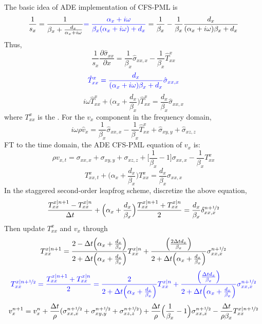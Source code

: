 The basic idea of ADE implementation of CFS-PML is
\[ \frac{1}{s_x}=\frac{1}{\beta_x+\frac{d_x}{\alpha_x+i\omega}} {\color{blue}=\frac{\alpha_x+i\omega}{\beta_x(\alpha_x+i\omega)+d_x}} =\frac{1}{\beta_x}-\frac{1}{\beta_x}\frac{d_x}{(\alpha_x+i\omega)\beta_x+d_x} \]
Thus,
\[ \frac{1}{s_x}\frac{\partial\hat\sigma_{xx}}{\partial x}=\frac{1}{\beta_x}\hat\sigma_{xx,x}-\frac{1}{\beta_x}\hat T_{xx}^x \]
\[ {\color{blue} \hat T_{xx}^x=\frac{d_x}{(\alpha_x+i\omega)\beta_x+d_x}\hat\sigma_{xx,x} } \]
\[ i\omega\hat T_{xx}^x+\Big(\alpha_x+\frac{d_x}{\beta_x}\Big)\hat T_{xx}^x=\frac{d_x}{\beta_x}\hat\sigma_{xx,x} \]
where $T_{xx}^x$ is the .
For the $v_x$ component in the frequency domain,
\[ i\omega\rho\hat v_x=\frac{1}{\beta_x}\hat\sigma_{xx,x}-\frac{1}{\beta_x}\hat T_{xx}^x+\hat\sigma_{xy,y}+\hat\sigma_{xz,z} \]
FT to the time domain, the ADE CFS-PML equation of $v_x$ is:
\[ \rho v_{x,t}=\sigma_{xx,x}+\sigma_{xy,y}+\sigma_{xz,z}+\Big[\frac{1}{\beta_x}-1\Big]\sigma_{xx,x}-\frac{1}{\beta_x}T_{xx}^x \]
\[ T_{xx,t}^x+\Big(\alpha_x+\frac{d_x}{\beta_x}\Big)T_{xx}^x=\frac{d_x}{\beta_x}\sigma_{xx,x} \]
In the staggered second-order leapfrog scheme, discretize the above equation,
\[ \frac{T_{xx}^{x|n+1}-T_{xx}^{x|n}}{\Delta t}+\Big(\alpha_x+\frac{d_x}{\beta_x}\Big)\frac{T_{xx}^{x|n+1}+T_{xx}^{x|n}}{2}=\frac{d_x}{\beta_x}\delta_{xx,x}^{n+\nicefrac{1}{2}} \]
Then update $T_{xx}^x$ and $v_x$ through
\[ T_{xx}^{x|n+1}=\frac{2-\Delta t\Big(\alpha_x+\frac{d_x}{\beta_x}\Big)}{2+\Delta t\Big(\alpha_x+\frac{d_x}{\beta_x}\Big)}T_{xx}^{x|n}+\frac{\Big(\frac{2\Delta td_x}{\beta_x}\Big)}{2+\Delta t\Big(\alpha_x+\frac{d_x}{\beta_x}\Big)}\sigma_{xx,x}^{n+\nicefrac{1}{2}} \]
\[ {\color{blue} T_{xx}^{x|n+\nicefrac{1}{2}}=\frac{T_{xx}^{x|n+1}+T_{xx}^{x|n}}{2}=\frac{2}{2+\Delta t\Big(\alpha_x+\frac{d_x}{\beta_x}\Big)}T_{xx}^{x|n}+\frac{\Big(\frac{\Delta td_x}{\beta_x}\Big)}{2+\Delta t\Big(\alpha_x+\frac{d_x}{\beta_x}\Big)}\sigma_{xx,x}^{n+\nicefrac{1}{2}} } \]
\[ v_x^{n+1}=v_x^n+\frac{\Delta t}{\rho}(\sigma_{xx,x}^{n+\nicefrac{1}{2}}+\sigma_{xy,y}^{n+\nicefrac{1}{2}}+\sigma_{xz,z}^{n+\nicefrac{1}{2}})+\frac{\Delta t}{\rho}\Big(\frac{1}{\beta_x}-1\Big)\sigma_{xx,x}^{n+\nicefrac{1}{2}}-\frac{\Delta t}{\rho\beta_x}T_{xx}^{x|n+\nicefrac{1}{2}} \]

